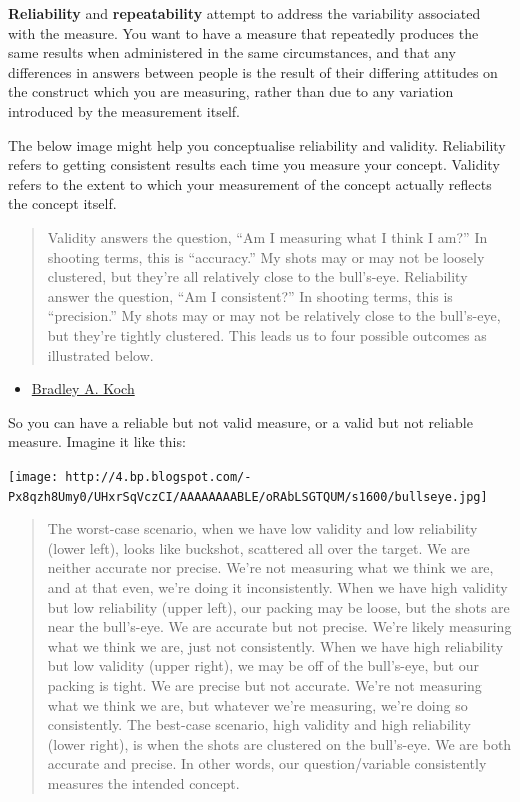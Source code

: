 \documentclass[
]{book}
\providecommand{\tightlist}{%
  \setlength{\itemsep}{0pt}\setlength{\parskip}{0pt}}
\begin{document}
\textbf{Reliability} and \textbf{repeatability} attempt to address the variability associated with the measure. You want to have a measure that repeatedly produces the same results when administered in the same circumstances, and that any differences in answers between people is the result of their differing attitudes on the construct which you are measuring, rather than due to any variation introduced by the measurement itself.

The below image might help you conceptualise reliability and validity. Reliability refers to getting consistent results each time you measure your concept. Validity refers to the extent to which your measurement of the concept actually reflects the concept itself.

\begin{quote}
Validity answers the question, ``Am I measuring what I think I am?'' In shooting terms, this is ``accuracy.'' My shots may or may not be loosely clustered, but they're all relatively close to the bull's-eye. Reliability answer the question, ``Am I consistent?'' In shooting terms, this is ``precision.'' My shots may or may not be relatively close to the bull's-eye, but they're tightly clustered. This leads us to four possible outcomes as illustrated below.
\end{quote}

\begin{itemize}
\tightlist
\item
  \href{http://www.socingoutloud.com/2012/10/teaching-validity-and-reliability-in.html}{Bradley A. Koch}
\end{itemize}

So you can have a reliable but not valid measure, or a valid but not reliable measure. Imagine it like this:

\texttt{[image: http://4.bp.blogspot.com/-Px8qzh8Umy0/UHxrSqVczCI/AAAAAAAABLE/oRAbLSGTQUM/s1600/bullseye.jpg]}

\begin{quote}
The worst-case scenario, when we have low validity and low reliability (lower left), looks like buckshot, scattered all over the target. We are neither accurate nor precise. We're not measuring what we think we are, and at that even, we're doing it inconsistently.
When we have high validity but low reliability (upper left), our packing may be loose, but the shots are near the bull's-eye. We are accurate but not precise. We're likely measuring what we think we are, just not consistently.
When we have high reliability but low validity (upper right), we may be off of the bull's-eye, but our packing is tight. We are precise but not accurate. We're not measuring what we think we are, but whatever we're measuring, we're doing so consistently.
The best-case scenario, high validity and high reliability (lower right), is when the shots are clustered on the bull's-eye. We are both accurate and precise. In other words, our question/variable consistently measures the intended concept.
\end{quote}
\end{document}
